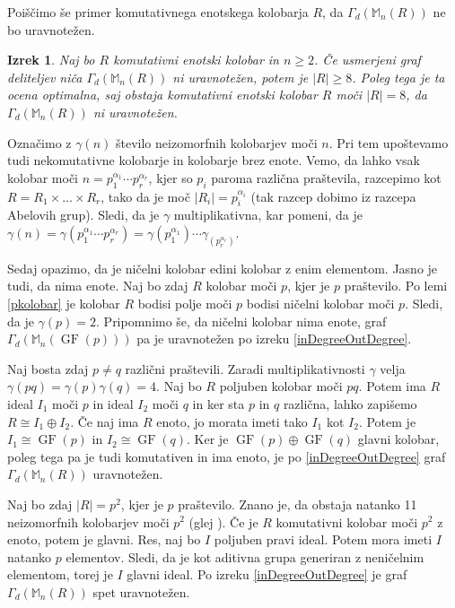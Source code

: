 \documentclass[a4paper, 12pt]{amsart}
\theoremstyle{definition} %
\theoremstyle{plain} %
\newtheorem{izrek}[definicija]{Izrek}
\newcommand{\M}{\mathbb M}
\DeclareMathOperator{\GF}{GF}
\begin{document}
Poiščimo še primer komutativnega enotskega kolobarja $R$, da $\Gamma_d(\M_n(R))$ ne bo uravnotežen.

\begin{izrek}
Naj bo $R$ komutativni enotski kolobar in $n\ge2$. Če usmerjeni graf deliteljev niča $\Gamma_d(\M_n(R))$ ni uravnotežen, potem je $|R| \ge 8$. Poleg tega je ta ocena optimalna, saj obstaja komutativni enotski kolobar $R$ moči $|R|=8$, da $\Gamma_d(\M_n(R))$ ni uravnotežen. 
\end{izrek} 

\proof
Označimo z $\gamma(n)$ število neizomorfnih kolobarjev moči $n$. Pri tem upoštevamo tudi nekomutativne kolobarje in kolobarje brez enote. Vemo, da lahko vsak kolobar moči $n=p_1^{\alpha_1}\cdots p_r^{\alpha_r}$, kjer so $p_i$ paroma različna praštevila, razcepimo kot $R=R_1\times \dots \times R_r$, tako da je moč $|R_i| = p_i^{\alpha_i}$ (tak razcep dobimo iz razcepa Abelovih grup). Sledi, da je $\gamma$ multiplikativna, kar pomeni, da je $\gamma(n) = \gamma(p_1^{\alpha_1}\cdots p_r^{\alpha_r}) = \gamma(p_1^{\alpha_1})\cdots \gamma_(p_r^{\alpha_r})$. 

Sedaj opazimo, da je ničelni kolobar edini kolobar  z enim elementom. Jasno je tudi, da nima enote. Naj bo zdaj $R$ kolobar moči $p$, kjer je $p$ praštevilo. Po lemi \ref{pkolobar} je kolobar $R$ bodisi polje moči $p$ bodisi ničelni kolobar moči $p$. Sledi, da je $\gamma(p)= 2$. Pripomnimo še, da ničelni kolobar nima enote, graf $\Gamma_d(\M_n(\GF(p)))$ pa je uravnotežen po izreku \ref{inDegreeOutDegree}. 

Naj bosta zdaj $p\neq q$ različni praštevili. Zaradi multiplikativnosti $\gamma$ velja $\gamma(pq) = \gamma(p)\gamma(q) = 4$. Naj bo $R$ poljuben kolobar moči $pq$. Potem ima $R$ ideal $I_1$ moči $p$ in ideal $I_2$ moči $q$ in ker sta $p$ in $q$ različna, lahko zapišemo $R\cong I_1 \oplus I_2$. Če naj ima $R$ enoto, jo morata imeti tako $I_1$ kot $I_2$. Potem je $I_1\cong \GF(p)$ in $I_2\cong \GF(q)$. Ker je $\GF(p) \oplus \GF(q)$ glavni kolobar, poleg tega pa je tudi komutativen in ima enoto, je po \ref{inDegreeOutDegree} graf $\Gamma_d(\M_n(R))$ uravnotežen. 

Naj bo zdaj $|R|=p^2$, kjer je $p$ praštevilo. Znano je, da obstaja natanko 11 neizomorfnih kolobarjev moči $p^2$ (glej \cite{Fine}). Če je $R$ komutativni kolobar moči $p^2$ z enoto, potem je glavni. Res, naj bo $I$ poljuben pravi ideal. Potem mora imeti $I$ natanko $p$ elementov. Sledi, da je kot aditivna grupa generiran z neničelnim elementom, torej je $I$ glavni ideal. Po izreku \ref{inDegreeOutDegree} je graf $\Gamma_d(\M_n(R))$ spet uravnotežen.
\end{document}
